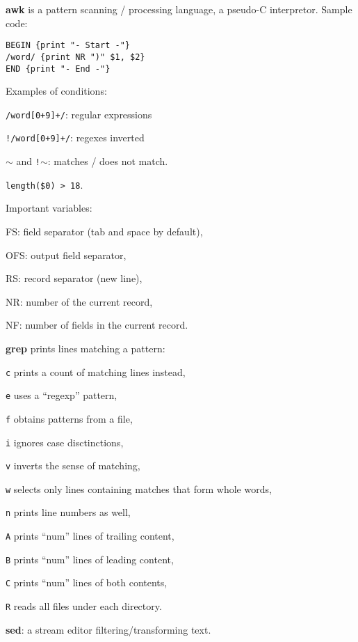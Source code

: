 \renewcommand\theFancyVerbLine{\normalsize\arabic{FancyVerbLine}}

\begin{enumx}
	\item [\cmd] \textbf{awk} is a pattern scanning / processing language,
	a pseudo-C interpretor.
	Sample code:
\begin{verbatim}
BEGIN {print "- Start -"}
/word/ {print NR ")" $1, $2}
END {print "- End -"}
\end{verbatim}

\item [] Examples of conditions:
\begin{enumx}
	\item \texttt{/word[0+9]+/}: regular expressions
	\item \texttt{!/word[0+9]+/}: regexes inverted
	\item \texttt{$\sim$} and \texttt{!$\sim$}: matches / does not match.
	\item \texttt{length(\$0) > 18}.
\end{enumx} 

\item [] Important variables:
\begin{enumx}
	\item FS: field separator (tab and space by default),
	\item OFS: output field separator,
	\item RS: record separator (new line),
	\item NR: number of the current record,
	\item NF: number of fields in the current record.
\end{enumx} 

\item [\cmd] \textbf{grep} prints lines matching a pattern:
\item [\texttt{c}] prints a count of matching lines instead,
\item [\texttt{e}] uses a ``regexp'' pattern,
\item [\texttt{f}] obtains patterns from a file,
\item [\texttt{i}] ignores case disctinctions,
\item [\texttt{v}] inverts the sense of matching,
\item [\texttt{w}] selects only lines containing matches that form whole words,
\item [\texttt{n}] prints line numbers as well,
\item [\texttt{A}] prints ``num'' lines of trailing content,
\item [\texttt{B}] prints ``num'' lines of leading content,
\item [\texttt{C}] prints ``num'' lines of both contents,
\item [\texttt{R}] reads all files under each directory.
\item [\cmd] \textbf{sed}: a stream editor filtering/transforming text.
\end{enumx}

